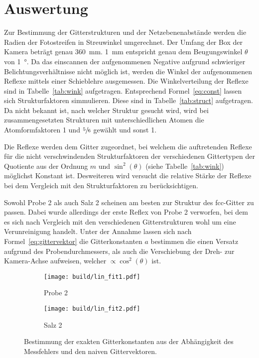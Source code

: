 \section{Auswertung}\label{sec:Auswertung}

Zur Bestimmung der Gitterstrukturen und der Netzebenenabstände werden die
Radien der Fotostreifen in Streuwinkel umgerechnet.
Der Umfang der Box der Kamera beträgt genau \SI{360}{\milli\meter}.
\SI{1}{\milli\meter} entspricht genau dem Beugungswinkel $\theta$ von
\SI{1}{\degree}.
Da das einscannen der aufgenommenen Negative aufgrund schwieriger
Belichtungsverhältnisse nicht möglich ist, werden die Winkel der aufgenommenen
Reflexe mittels einer Schieblehre ausgemessen.
Die Winkelverteilung der Reflexe sind in Tabelle~\ref{tab:wink} aufgetragen.
Entsprechend Formel~\eqref{eq:const} lassen sich Strukturfaktoren simmulieren.
Diese sind in Tabelle~\ref{tab:struct} aufgetragen.
Da nicht bekannt ist, nach welcher Struktur gesucht wird, wird bei
zusammengesetzten Strukturen mit unterschiedlichen Atomen die Atomformfaktoren
1 und $\sfrac{5}{6}$ gewählt und sonst 1.

Die Reflexe werden dem Gitter zugeordnet, bei welchem die auftretenden Reflexe für
die nicht verschwindenden Strukturfaktoren der verschiedenen Gittertypen der
Quotiente aus der Ordnung $m$ und $\sin^2(\theta)$ (siehe Tabelle~\ref{tab:wink})
möglichst Konstant ist.
Desweiteren wird versucht die relative Stärke der Reflexe bei dem Vergleich mit den
Strukturfaktoren zu berücksichtigen.

Sowohl Probe 2 als auch Salz 2 scheinen am besten zur Struktur des fcc-Gitter zu
passen.
Dabei wurde allerdings der erste Reflex von Probe 2 verworfen, bei dem es sich
nach Vergleich mit den verschiedenen Gitterstrukturen wohl um eine Verunreinigung
handelt.
Unter der Annahme lassen sich nach Formel~\eqref{eq:gittervektor} die
Gitterkonstanten $a$ bestimmen die einen Versatz aufgrund des
Probendurchmessers, als auch die Verschiebung der Dreh- zur Kamera-Achse
aufweisen, welcher $\propto \cos^2(\theta)$ ist.
\begin{figure}[ht]
		\centering
		\begin{subfigure}{0.49\textwidth}
				\centering
				\texttt{[image: build/lin\_fit1.pdf]}
				\caption{Probe 2}
				\label{fig:prb1}
		\end{subfigure}
		\begin{subfigure}{0.49\textwidth}
				\centering
				\texttt{[image: build/lin\_fit2.pdf]}
				\caption{Salz 2}
				\label{fig:prb1}
		\end{subfigure}
		\caption{Bestimmung der exakten Gitterkonstanten aus der Abhängigkeit
		des	Messfehlers und den naiven Gittervektoren.}
\end{figure}

